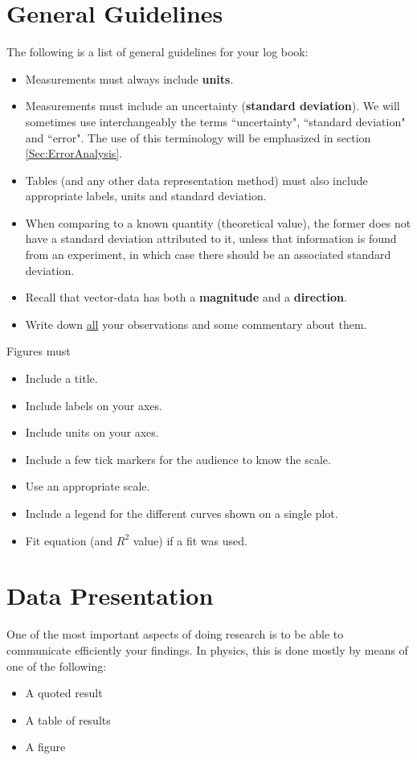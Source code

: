 \documentclass[12pt]{report}
\def\anhkhoi#1{{\color{purple}[#1]}}
\begin{document}
\section{General Guidelines}
\label{Sec:General-guidelines}
The following is a list of general guidelines for your log book:
\begin{itemize}
\item Measurements must always include \textbf{units}.
\item Measurements must include an uncertainty (\textbf{standard deviation}). We will sometimes use interchangeably the terms ``uncertainty", ``standard deviation" and ``error". The use of this terminology will be emphasized in section \ref{Sec:ErrorAnalysis}.
\item Tables (and any other data representation method) must also include appropriate labels, units and standard deviation.
\item When comparing to a known quantity (theoretical value), the former does not have a standard deviation attributed to it, unless that information is found from an experiment, in which case there should be an associated standard deviation.
\item Recall that vector-data has both a \textbf{magnitude} and a \textbf{direction}.
\item Write down \underline{all} your observations and some commentary about them.
\end{itemize}

\noindent Figures must
\begin{itemize}
\item Include a title.
\item Include labels on your axes.
\item Include units on your axes.
\item Include a few tick markers for the audience to know the scale.
\item Use an appropriate scale.
\item Include a legend for the different curves shown on a single plot.
\item Fit equation (and $R^2$ value) if a fit was used.
\end{itemize}

\section{Data Presentation} \label{Sec:Data-presentation}
One of the most important aspects of doing research is to be able to communicate efficiently your findings. In physics, this is done mostly by means of one of the following:
\begin{itemize}
\item A quoted result
\item A table of results
\item A figure
\end{itemize}
\end{document}
